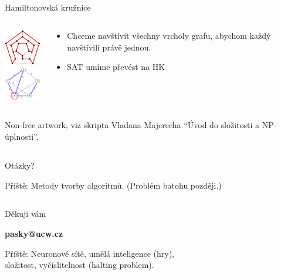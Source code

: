 \documentclass{beamer}
\begin{document}
\subsection{}
\begin{frame}{Hamiltonovská kružnice}
\begin{columns}
\begin{column}{2cm}
\includegraphics[width=2cm]{Hamiltonian_path.pdf} \\
\includegraphics[width=2cm]{TSP.png}
\end{column}
\begin{column}{10cm}
\begin{itemize}
\item Chceme navštívit všechny vrcholy grafu, abychom každý navštívili právě jednou.
\item SAT umíme převést na HK
\end{itemize}
\end{column}
\end{columns}
Non-free artwork, viz skripta Vladana Majerecha ``Úvod do složitosti a NP-úplnosti''.
\end{frame}

\subsection{}
\begin{frame}{Otázky?}
\begin{center}
Příště: Metody tvorby algoritmů. (Problém batohu později.)
\end{center}
\end{frame}

\subsection{}
\begin{frame}{Děkuji vám}
\begin{center}
{\bf pasky@ucw.cz}

Příště: Neuronové sítě, umělá inteligence (hry), \\ složitost, vyčíslitelnost (halting problem).
\end{center}
\end{frame}
\end{document}
